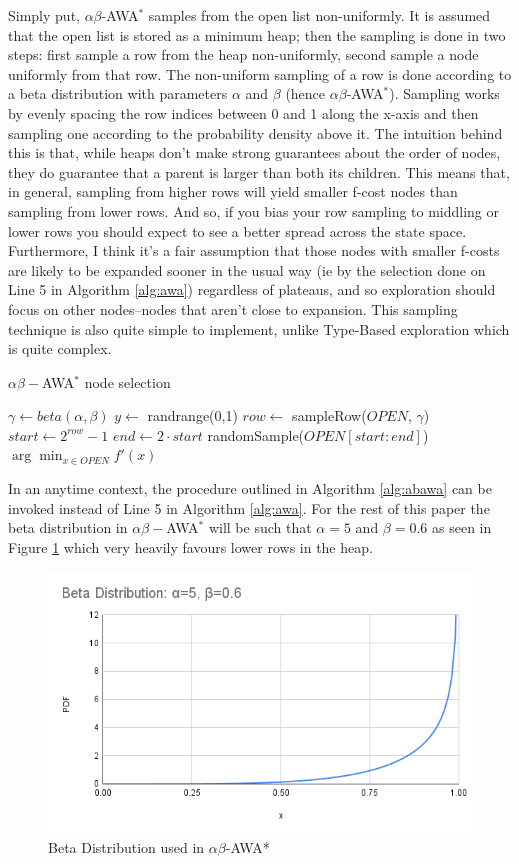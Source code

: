 Simply put, $\alpha \beta$-AWA$^*$ samples from the open list non-uniformly. It is assumed that the open list is stored as a minimum heap; then the sampling is done in two steps: first sample a row from the heap non-uniformly, second sample a node uniformly from that row. The non-uniform sampling of a row is done according to a beta distribution with parameters $\alpha$ and $\beta$ (hence $\alpha \beta$-AWA$^*$). Sampling works by evenly spacing the row indices between 0 and 1 along the x-axis and then sampling one according to the probability density above it. The intuition behind this is that, while heaps don't make strong guarantees about the order of nodes, they do guarantee that a parent is larger than both its children. This means that, in general, sampling from higher rows will yield smaller f-cost nodes than sampling from lower rows. And so, if you bias your row sampling to middling or lower rows you should expect to see a better spread across the state space. Furthermore, I think it's a fair assumption that those nodes with smaller f-costs are likely to be expanded sooner in the usual way (ie by the selection done on Line 5 in Algorithm \ref{alg:awa}) regardless of plateaus, and so exploration should focus on other nodes--nodes that aren't close to expansion. This sampling technique is also quite simple to implement, unlike Type-Based exploration which is quite complex.

\begin{algorithm}
\caption{$\alpha \beta-$AWA$^*$ node selection}\label{alg:abawa}
\begin{algorithmic}
\Require $\gamma \gets beta(\alpha, \beta)$
\State $y \gets $ randrange(0,1)
    \State $row \gets $ sampleRow($OPEN$, $\gamma$)
    \State $start \gets 2^{row}-1$
    \State $end \gets 2 \cdot start$
    \State \Return randomSample($OPEN[start:end]$)
\Else{}
    \State \Return $\arg \min_{x \in OPEN} f'(x)$
\EndIf
\end{algorithmic}
\end{algorithm}

In an anytime context, the procedure outlined in Algorithm \ref{alg:abawa} can be invoked instead of Line 5 in Algorithm \ref{alg:awa}. For the rest of this paper the beta distribution in $\alpha \beta-$AWA$^*$ will be such that $\alpha=5$ and $\beta=0.6$ as seen in Figure \ref{fig:beta} which very heavily favours lower rows in the heap.

\noindent
\begin{figure}
    \begin{center}\includegraphics[scale=0.35]{media/beta.png}\end{center}
    \caption{Beta Distribution used in $\alpha\beta$-AWA*}\label{fig:beta}
\end{figure}
